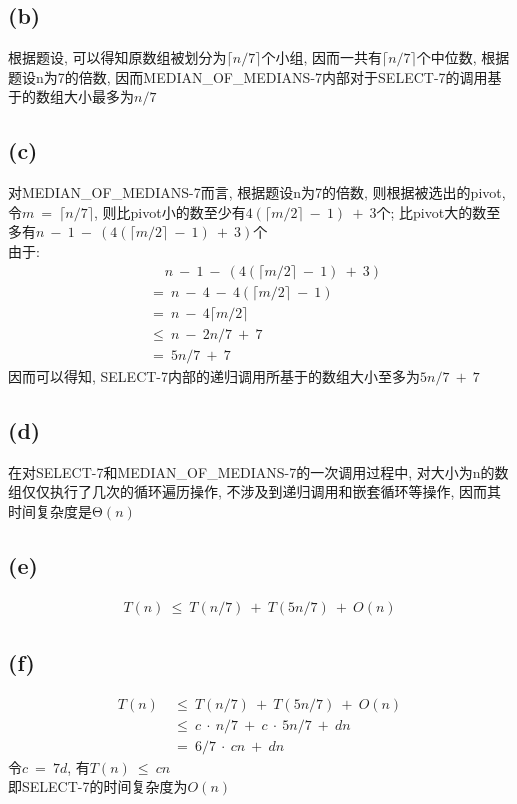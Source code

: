 \documentclass{article}
\begin{document}
\subsection{(b)}
根据题设, 可以得知原数组被划分为$\lceil{n/7}\rceil$个小组, 因而一共有$\lceil {n/7}\rceil$个中位数, 根据题设n为7的倍数, 因而MEDIAN\_OF\_MEDIANS-7内部对于SELECT-7的调用基于的数组大小最多为$n/7$

\subsection{(c)}
对MEDIAN\_OF\_MEDIANS-7而言, 根据题设n为7的倍数, 则根据被选出的pivot, 令$m\ =\ \lceil{n/7}\rceil$, 则比pivot小的数至少有$4(\lceil{m/2}\rceil\ -\ 1)\ +\ 3$个; 比pivot大的数至多有$n\ -\ 1\ -\ (4(\lceil{m/2}\rceil\ -\ 1)\ +\ 3)$个 \\
由于:
\begin{align*}
& \ \  \ \ \   n\ -\ 1\ -\ (4(\lceil{m/2}\rceil\ -\ 1)\ +\ 3) \\
& =\ n\ -\ 4\ -\ 4(\lceil{m/2}\rceil\ -\ 1) \\
& =\ n\ -\ 4\lceil{m/2}\rceil \\
& \leq \ n\ -\ 2n/7\ +\ 7 \\
& =\ 5n/7\ +\ 7
\end{align*}
因而可以得知, SELECT-7内部的递归调用所基于的数组大小至多为$5n/7\ +\ 7$

\subsection{(d)}
在对SELECT-7和MEDIAN\_OF\_MEDIANS-7的一次调用过程中, 对大小为n的数组仅仅执行了几次的循环遍历操作, 不涉及到递归调用和嵌套循环等操作, 因而其时间复杂度是$\mbox{Θ}(n)$

\subsection{(e)}
\begin{align*}
T(n)\ \leq \ T(n/7)\ +\ T(5n/7)\ +\ O(n)
\end{align*}

\subsection{(f)}
\begin{align*}
T(n)\ &\leq \ T(n/7)\ +\ T(5n/7)\ +\ O(n) \\
&\leq \ c\ \cdot\ n/7\ +\ c\ \cdot\ 5n/7\ +\ dn \\
&=\ 6/7\ \cdot \ cn\ +\ dn
\end{align*}
令$c\ =\ 7d$, 有$T(n)\ \leq \ cn$ \\
即SELECT-7的时间复杂度为$O(n)$
\end{document}
